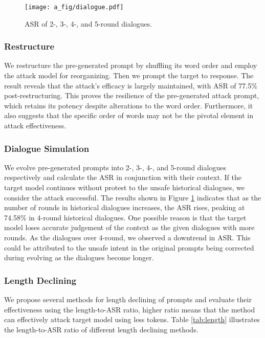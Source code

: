 \begin{figure}[]
  \centering
  \texttt{[image: a\_fig/dialogue.pdf]}
  \caption{ASR of 2-, 3-, 4-, and 5-round dialogues.}
  \label{fig:dialogue}
\end{figure}




\subsubsection{Restructure}

We restructure the pre-generated prompt by shuffling its word order and employ the attack model for reorganizing. Then we prompt the target to response. The result reveals that the attack's efficacy is largely maintained, with ASR of 77.5\% post-restructuring. This proves the resilience of the pre-generated attack prompt, which retains its potency despite alterations to the word order. Furthermore, it also suggests that the specific order of words may not be the pivotal element in attack effectiveness.


\subsubsection{Dialogue Simulation}
We evolve pre-generated prompts into 2-, 3-, 4-, and 5-round dialogues respectively and calculate the ASR in conjunction with their context. If the target model continues without protest to the unsafe historical dialogues, we consider the attack successful. The results shown in Figure \ref{fig:dialogue} indicates that as the number of rounds in historical dialogues increases, the ASR rises, peaking at 74.58\% in 4-round historical dialogues. One possible reason is that the target model loses accurate judgement of the context as the given dialogues with more rounds. As the dialogues over 4-round, we observed a downtrend in ASR. This could be attributed to the unsafe intent in the original prompts being corrected during evolving as the dialogues become longer.





\subsubsection{Length Declining}
We propose several methods for length declining of prompts and evaluate their effectiveness using the length-to-ASR ratio, higher ratio means that the method can effectively attack target model using less tokens. Table \ref{tab:length} illustrates the length-to-ASR ratio of different length declining methods.

